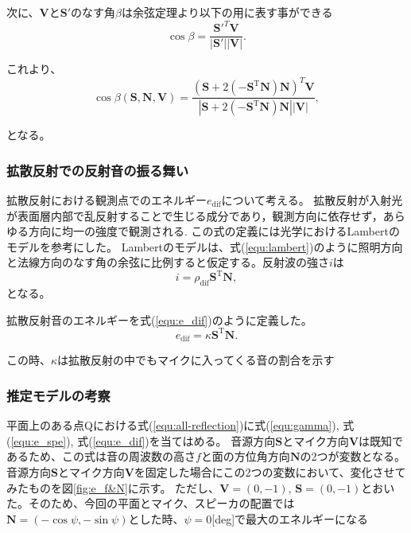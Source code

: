 次に、$\mathbf{V}$と$\mathbf{S'}$のなす角$\beta$は余弦定理より以下の用に表す事ができる
\begin{equation}
	\cos\beta = \frac{\mathbf{S'}^{T}\mathbf{V}}{|\mathbf{S'}||\mathbf{V}|}.
\end{equation}

これより、
\begin{equation}
	\cos\beta(\mathbf{S}, \mathbf{N}, \mathbf{V}) = \frac{(\mathbf{S} + 2(- \mathbf{S}^{\mathrm{T}} \mathbf{N}) \mathbf{N})^{T}\mathbf{V}}{|\mathbf{S} + 2(- \mathbf{S}^{\mathrm{T}} \mathbf{N}) \mathbf{N}||\mathbf{V}|},
\end{equation}

となる。

\subsubsection{拡散反射での反射音の振る舞い\label{diff}}
拡散反射における観測点でのエネルギー$e_\mathrm{dif}$について考える。
拡散反射が入射光が表面層内部で乱反射することで生じる成分であり，観測方向に依存せず，あらゆる方向に均一の強度で観測される.
この式の定義には光学におけるLambertのモデルを参考にした。
Lambertのモデルは、式(\ref{equ:lambert})のように照明方向と法線方向のなす角の余弦に比例すると仮定する。反射波の強さ$i$は
\begin{equation}
	\label{equ:lambert}
	i = \rho_\mathrm{dif}\mathbf{S}^{\mathrm{T}}\mathbf{N},
\end{equation}
となる。

拡散反射音のエネルギーを式(\ref{equ:e_dif})のように定義した。
\begin{equation}
    \label{equ:e_dif}
    e_\mathrm{dif} = \kappa\mathbf{S}^{\mathrm{T}}\mathbf{N}.
\end{equation}
    
この時、$\kappa$は拡散反射の中でもマイクに入ってくる音の割合を示す

\subsubsection{推定モデルの考察}
平面上のある点Qにおける式(\ref{equ:all-reflection})に式(\ref{equ:gamma}), 式(\ref{equ:e_spe}), 式(\ref{equ:e_dif})を当てはめる。
音源方向$\mathbf{S}$とマイク方向$\mathbf{V}$は既知であるため、この式は音の周波数の高さ$f$と面の方位角方向$\mathbf{N}$の2つが変数となる。
音源方向$\mathbf{S}$とマイク方向$\mathbf{V}$を固定した場合にこの2つの変数において、変化させてみたものを図\ref{fig:e_f&N}に示す。
ただし、$\mathbf{V}=(0,-1)$, $\mathbf{S}=(0,-1)$とおいた。そのため、今回の平面とマイク、スピーカの配置では$\mathbf{N} = (-\cos{\psi}, -\sin{\psi})$とした時、$\psi =0$[deg]で最大のエネルギーになる

